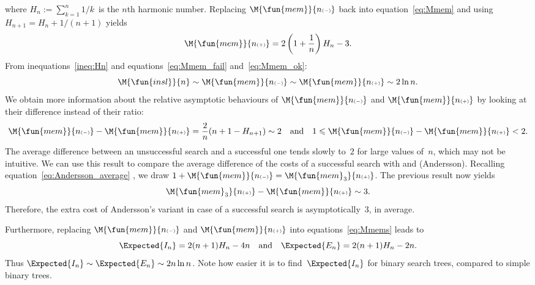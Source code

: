 where \(H_n := \sum_{k=1}^{n}1/k\)~is the \(n\)th harmonic
number. Replacing
\(\M{\fun{mem}}{n{\scriptscriptstyle (-)}}\) back into
equation~\eqref{eq:Mmem} and using \(H_{n+1} = H_n + 1/(n+1)\) yields
\begin{equation}
\M{\fun{mem}}{n{\scriptscriptstyle (+)}} =
2\left(1+\frac{1}{n}\right)H_n - 3.
\index{mem@$\M{\fun{mem}}{n{\scriptscriptstyle (+)}}$}
\label{eq:Mmem_ok}
\end{equation}
From inequations~\eqref{ineq:Hn}  and
equations~\eqref{eq:Mmem_fail} and~\eqref{eq:Mmem_ok}:
\begin{equation*}
\M{\fun{insl}}{n}
\sim \M{\fun{mem}}{n{\scriptscriptstyle (-)}}
\sim \M{\fun{mem}}{n{\scriptscriptstyle (+)}} \sim 2 \ln n.
\end{equation*}
We obtain more information about the relative asymptotic behaviours of
\(\M{\fun{mem}}{n{\scriptscriptstyle(-)}}\) and
\(\M{\fun{mem}}{n{\scriptscriptstyle(+)}}\) by looking at their
difference instead of their ratio:
\begin{equation*}
\M{\fun{mem}}{n{\scriptscriptstyle (-)}} -
\M{\fun{mem}}{n{\scriptscriptstyle (+)}} =
\frac{2}{n}(n + 1 - H_{n+1}) \sim 2
\quad\text{and}\quad
1 \leqslant \M{\fun{mem}}{n{\scriptscriptstyle (-)}} -
\M{\fun{mem}}{n{\scriptscriptstyle (+)}} < 2.
\end{equation*}
The average difference between an unsuccessful search and a successful
one tends slowly to~\(2\) for large values of~\(n\), which may not be
intuitive. We can use this result to compare the average difference of
the costs of a successful search with  and
 (Andersson). Recalling
equation~\eqref{eq:Andersson_average} ,
we draw \(1 + \M{\fun{mem}}{n{\scriptscriptstyle (-)}} =
\M{\fun{mem}_3}{n{\scriptscriptstyle (+)}}\). The previous result now
yields
\begin{equation*}
  \M{\fun{mem}_3}{n{\scriptscriptstyle (+)}} -
  \M{\fun{mem}}{n{\scriptscriptstyle (+)}} \sim 3.
\index{mem3@$\M{\fun{mem}_3}{n{\scriptscriptstyle (+)}}$}
\end{equation*}
Therefore, the extra cost of Andersson's variant in case of a
successful search is asymptotically~\(3\), in average.

Furthermore, replacing \(\M{\fun{mem}}{n{\scriptscriptstyle
    (-)}}\) and \(\M{\fun{mem}}{n{\scriptscriptstyle (+)}}\) into
equations~\eqref{eq:Mmems} leads to
\begin{equation}
\Expected{I_n} = 2(n+1)H_n - 4n
\quad\text{and}\quad
\Expected{E_n} = 2(n+1)H_n - 2n.
\label{eq:IEn}
\end{equation}
Thus \(\Expected{I_n} \sim \Expected{E_n} \sim 2n\ln n\). Note how
easier it is to find~\(\Expected{I_n}\) for binary search trees,
compared to simple binary trees.

